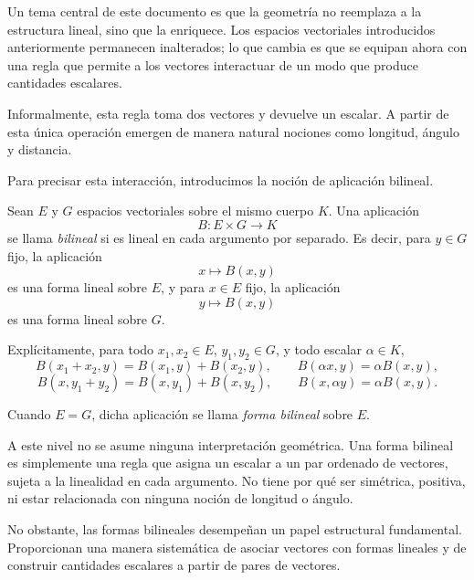 \medskip

Un tema central de este documento es que la geometría no reemplaza a la
estructura lineal, sino que la enriquece.
Los espacios vectoriales introducidos anteriormente permanecen inalterados;
lo que cambia es que se equipan ahora con una regla que permite a los vectores
interactuar de un modo que produce cantidades escalares.

\medskip

Informalmente, esta regla toma dos vectores y devuelve un escalar.
A partir de esta única operación emergen de manera natural nociones como
longitud, ángulo y distancia.

\medskip

Para precisar esta interacción, introducimos la noción de aplicación bilineal.

\medskip

Sean $E$ y $G$ espacios vectoriales sobre el mismo cuerpo $K$.
Una aplicación
\[
B : E \times G \longrightarrow K
\]
se llama \emph{bilineal} si es lineal en cada argumento por separado.
Es decir, para $y \in G$ fijo, la aplicación
\[
x \longmapsto B(x,y)
\]
es una forma lineal sobre $E$, y para $x \in E$ fijo, la aplicación
\[
y \longmapsto B(x,y)
\]
es una forma lineal sobre $G$.

\medskip

Explícitamente, para todo $x_1,x_2 \in E$, $y_1,y_2 \in G$, y todo escalar
$\alpha \in K$,
\[
B(x_1 + x_2, y) = B(x_1, y) + B(x_2, y), \qquad
B(\alpha x, y) = \alpha B(x, y),
\]
\[
B(x, y_1 + y_2) = B(x, y_1) + B(x, y_2), \qquad
B(x, \alpha y) = \alpha B(x, y).
\]

\medskip

Cuando $E = G$, dicha aplicación se llama \emph{forma bilineal} sobre $E$.

\medskip

A este nivel no se asume ninguna interpretación geométrica.
Una forma bilineal es simplemente una regla que asigna un escalar a un par
ordenado de vectores, sujeta a la linealidad en cada argumento.
No tiene por qué ser simétrica, positiva, ni estar relacionada con ninguna
noción de longitud o ángulo.

\medskip

No obstante, las formas bilineales desempeñan un papel estructural fundamental.
Proporcionan una manera sistemática de asociar vectores con formas lineales
y de construir cantidades escalares a partir de pares de vectores.

\medskip

